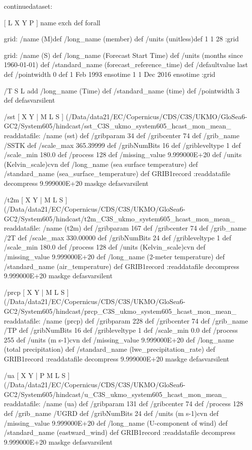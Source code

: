 \begin{ingrid}

continuedataset:

[ L X Y P ] { name exch def } forall

grid:
/name (M)def
/long_name (member) def
/units (unitless)def
 1 1 28
:grid

grid:
/name (S) def
/long_name (Forecast Start Time) def
/units (months since 1960-01-01) def
/standard_name (forecast_reference_time) def
/defaultvalue { last } def
/pointwidth 0 def
1 Feb 1993 ensotime
1
1 Dec 2016 ensotime
:grid

/T { S L add
/long_name (Time) def
/standard_name (time) def 
/pointwidth 3 def
} defasvarsilent

/sst {
[ X Y | M L S ] (/Data/data21/EC/Copernicus/CDS/C3S/UKMO/GloSea6-GC2/System605/hindcast/sst_C3S_ukmo_system605_hcast_mon_mean_%
 readdatafile:
 /name (sst) def
 /gribparam 34 def
 /gribcenter 74 def
 /grib_name /SSTK def
 /scale_max 365.39999 def
 /gribNumBits 16 def
 /gribleveltype 1 def
 /scale_min 180.0 def
 /process 128 def
 /missing_value 9.999000E+20 def
 /units (Kelvin_scale)cvn def
 /long_name (sea surface temperature) def
 /standard_name (sea_surface_temperature) def
 GRIB1record :readdatafile
 decompress
 9.999000E+20 maskge
}defasvarsilent

/t2m {
[ X Y | M L S ] (/Data/data21/EC/Copernicus/CDS/C3S/UKMO/GloSea6-GC2/System605/hindcast/t2m_C3S_ukmo_system605_hcast_mon_mean_%
 readdatafile:
 /name (t2m) def
 /gribparam 167 def
 /gribcenter 74 def
 /grib_name /2T def
 /scale_max 330.00000 def
 /gribNumBits 24 def
 /gribleveltype 1 def
 /scale_min 180.0 def
 /process 128 def
 /units (Kelvin_scale)cvn def
 /missing_value 9.999000E+20 def
 /long_name (2-meter temperature) def
 /standard_name (air_temperature) def
 GRIB1record :readdatafile
 decompress
 9.999000E+20 maskge
}defasvarsilent

/prcp {
[ X Y | M L S ] (/Data/data21/EC/Copernicus/CDS/C3S/UKMO/GloSea6-GC2/System605/hindcast/prcp_C3S_ukmo_system605_hcast_mon_mean_%
 readdatafile:
 /name (prcp) def
 /gribparam 228 def
 /gribcenter 74 def
 /grib_name /TP def
 /gribNumBits 16 def
 /gribleveltype 1 def
 /scale_min 0.0 def
 /process 255 def
 /units (m s-1)cvn def
 /missing_value 9.999000E+20 def
 /long_name (total precipitation) def
 /standard_name (lwe_precipitation_rate) def
 GRIB1record :readdatafile
 decompress
 9.999000E+20 maskge
}defasvarsilent

/ua {
[ X Y | P M L S ] (/Data/data21/EC/Copernicus/CDS/C3S/UKMO/GloSea6-GC2/System605/hindcast/u_C3S_ukmo_system605_hcast_mon_mean_%
 readdatafile:
 /name (ua) def
 /gribparam 131 def
 /gribcenter 74 def
 /process 128 def
 /grib_name /UGRD def
 /gribNumBits 24 def
 /units (m s-1)cvn def
 /missing_value 9.999000E+20 def
 /long_name (U-component of wind) def
 /standard_name (eastward_wind) def
 GRIB1record :readdatafile
 decompress
 9.999000E+20 maskge
} defasvarsilent


\end{ingrid}
